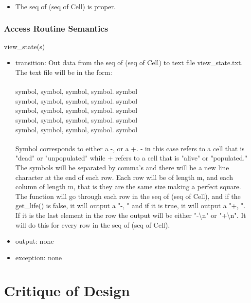 \documentclass[12pt]{article}
\begin{document}
\begin{itemize}
    \item The seq of (seq of Cell) is proper.
\end{itemize}

\subsubsection* {Access Routine Semantics}

view\_state(s)
\begin{itemize}
    \item transition: Out data from the seq of (seq of Cell) to text file view\_state.txt. The text file will be in the form:\\
    \\
    symbol, symbol, symbol, symbol. symbol\\
    symbol, symbol, symbol, symbol. symbol\\
    symbol, symbol, symbol, symbol. symbol\\
    symbol, symbol, symbol, symbol. symbol\\
    symbol, symbol, symbol, symbol. symbol\\
    \\
    Symbol corresponds to either a -, or a +. - in this case refers to a cell that is "dead" or "unpopulated" while + refers to a cell that is "alive" or "populated." The symbols will be separated by comma's and there will be a new line character at the end of each row. Each row will be of length m, and each column of length m, that is they are the same size making a perfect square.\\
    
    The function will go through each row in the seq of (seq of Cell), and if the get\_life() is false, it will output a "-, " and if it is true, it will output a "+, ". If it is the last element in the row the output will be either "-\textbackslash n" or "+\textbackslash n". It will do this for every row in the seq of (seq of Cell).
    
    \item output: none
    \item exception: none
\end{itemize}

\newpage

\section*{Critique of Design}
\end{document}
